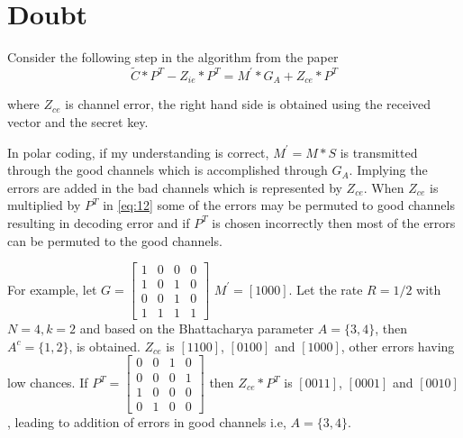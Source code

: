 \documentclass{article}
\begin{document}

\section{Doubt}
Consider the following step in the algorithm from the paper \cite{hooshmand2013secret}
\begin{equation}\label{eq:12}
\tilde{C}*P^{T} - Z_{ie}*P^{T}  = M^{'}*G_{A} + Z_{ce}*P^{T}
\end{equation}

where $Z_{ce}$ is channel error, the right hand side is obtained using the received vector and the secret key. \newline

In polar coding, if my understanding is correct, $M^{'} = M*S$ is transmitted through the good channels which is accomplished through $G_{A}$. Implying the errors are added in the bad channels which is represented by $Z_{ce}$. When $Z_{ce}$ is multiplied by $P^{T}$ in \ref{eq:12} some of the errors may be permuted to good channels resulting in decoding error and if $P^{T}$ is chosen incorrectly then most of the errors can be permuted to the good channels. \newline

For example, let $G = \begin{bmatrix}
    1       & 0 & 0 & 0 \\
    1       & 0 & 1 & 0 \\
    0       & 0 & 1 & 0 \\
    1       & 1 & 1 & 1
\end{bmatrix} $ $M^{'} = [1 0 0 0]$. Let the rate $R = 1/2$ with $N=4, k=2$ and based on the Bhattacharya parameter $A = \{3, 4\}$, then $A^{c}=\{1, 2\}$, is obtained. $Z_{ce}$ is $[1 1 0 0]$, $[0 1 0 0]$ and $[1 0 0 0]$, other errors having low chances. If $P^{T} = \begin{bmatrix}
    0       & 0 & 1 & 0 \\
    0       & 0 & 0 & 1 \\
    1       & 0 & 0 & 0 \\
    0       & 1 & 0 & 0
\end{bmatrix}$ then $Z_{ce}*P^{T}$ is $[0 0 1 1]$, $[0 0 0 1]$ and $[0 0 1 0]$, leading to addition of errors in good channels i.e, $A = \{3,4\}$.
\end{document}
